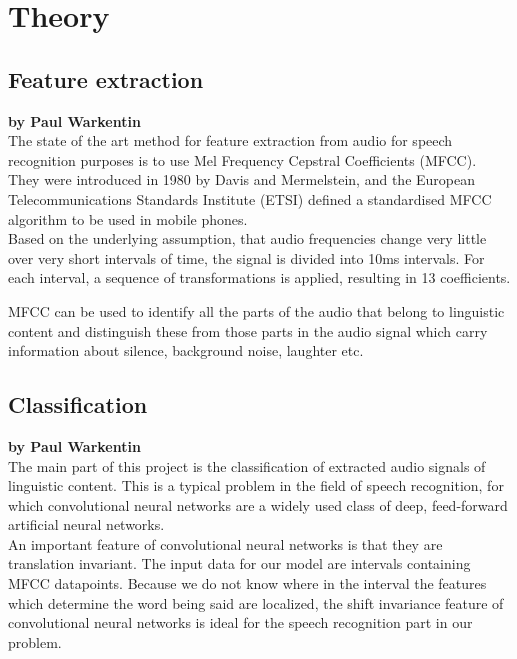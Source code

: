 \chapter{Theory}

\section{Feature extraction}

\textbf{by Paul Warkentin} \\

The state of the art method for feature extraction from audio for speech recognition purposes is to use Mel Frequency Cepstral Coefficients (MFCC). They were introduced in 1980 by Davis and Mermelstein, and the European Telecommunications Standards Institute (ETSI) defined a standardised MFCC algorithm to be used in mobile phones. \\
Based on the underlying assumption, that audio frequencies change very little over very short intervals of time, the signal is divided into 10ms intervals. For each interval, a sequence of transformations is applied, resulting in 13 coefficients.


MFCC can be used to identify all the parts of the audio that belong to linguistic content and distinguish these from those parts in the audio signal which carry information about silence, background noise, laughter etc.

\section{Classification}

\textbf{by Paul Warkentin} \\

The main part of this project is the classification of extracted audio signals of linguistic content. This is a typical problem in the field of speech recognition, for which convolutional neural networks are a widely used class of deep, feed-forward artificial neural networks. \\
An important feature of convolutional neural networks is that they are translation invariant. The input data for our model are intervals containing MFCC datapoints. Because we do not know where in the interval the features which determine the word being said are localized, the shift invariance feature of convolutional neural networks is ideal for the speech recognition part in our problem.


